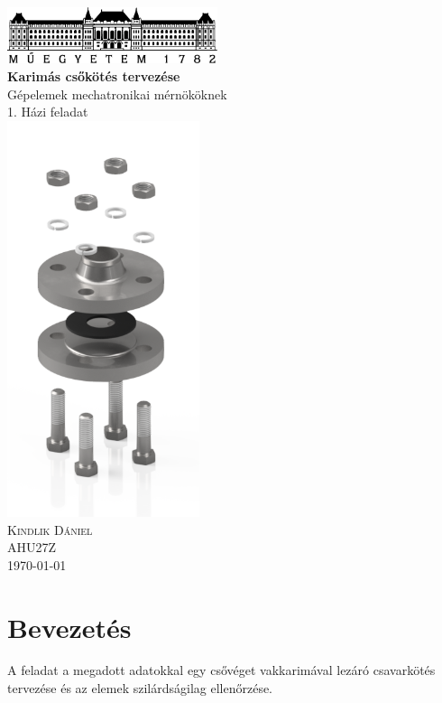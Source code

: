 \documentclass[10pt, a4paper]{article}
\begin{document}
	\begin{titlepage}
		\centering
		\includegraphics[width=175pt]{ BMElogo.png } \\
		\vspace*{2cm}
		{\Huge \bfseries Karimás csőkötés tervezése} \\
		\vspace{0.5cm}
		{\Large Gépelemek mechatronikai mérnököknek} \\
		\vspace{0.5cm}
		{\Large 1. Házi feladat} \\
		\includegraphics[width=160pt]{ osszeallitas.png } \\
		\vspace{1cm}
		{\Large \scshape Kindlik Dániel} \\
		\vspace{0.5cm}
		AHU27Z \\
		\vfill
		{\large \today} \\
	\end{titlepage}
	
	\thispagestyle{empty}
	\tableofcontents
	\newpage
	\setcounter{page}{3}
	\section*{Bevezetés}
	A feladat a megadott adatokkal egy csővéget vakkarimával lezáró csavarkötés tervezése és az elemek szilárdságilag
	ellenőrzése.
\end{document}
